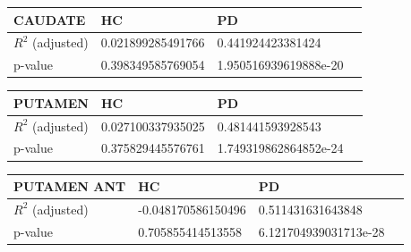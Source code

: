 \documentclass[]{article}
\begin{document}
\begin{tabular}{|l|l|l|r|}
	\hline
	CAUDATE & HC & PD \\
	\hline
	$R^2$ (adjusted) & 0.021899285491766 & 0.441924423381424 \\ 
	\hline
	p-value & 0.398349585769054 & 1.950516939619888e-20 \\
	\hline
\end{tabular}
\newline
\begin{tabular}{|l|l|l|r|}
	\hline
	PUTAMEN & HC & PD \\
	\hline
	$R^2$ (adjusted) & 0.027100337935025 & 0.481441593928543 \\ 
	\hline
	p-value & 0.375829445576761 & 1.749319862864852e-24 \\
	\hline
\end{tabular}
\newline
\begin{tabular}{|l|l|l|r|}
	\hline
	PUTAMEN ANT & HC & PD \\
	\hline
	$R^2$ (adjusted) &  -0.048170586150496 & 0.511431631643848 \\ 
	\hline
	p-value & 0.705855414513558 & 6.121704939031713e-28 \\
	\hline
\end{tabular}
\end{document}
